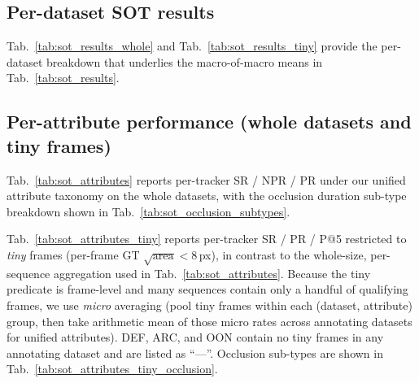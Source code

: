 \documentclass{article}
\begin{document}
\subsection{Per-dataset SOT results}
Tab.~\ref{tab:sot_results_whole} and Tab.~\ref{tab:sot_results_tiny} provide the
per-dataset breakdown that underlies the macro-of-macro means in
Tab.~\ref{tab:sot_results}.









\subsection{Per-attribute performance (whole datasets and tiny frames)}
Tab.~\ref{tab:sot_attributes} reports per-tracker SR / NPR / PR under our
unified attribute taxonomy on the whole datasets, with the occlusion
duration sub-type breakdown shown in Tab.~\ref{tab:sot_occlusion_subtypes}.



Tab.~\ref{tab:sot_attributes_tiny} reports per-tracker SR / PR / P@5 restricted
to \emph{tiny} frames (per-frame GT $\sqrt{\mathrm{area}} < 8$\,px), in contrast
to the whole-size, per-sequence aggregation used in
Tab.~\ref{tab:sot_attributes}. Because the tiny predicate is frame-level and
many sequences contain only a handful of qualifying frames, we use \emph{micro}
averaging (pool tiny frames within each (dataset, attribute) group, then take
arithmetic mean of those micro rates across annotating datasets for unified
attributes). DEF, ARC, and OON contain no tiny frames in any annotating dataset
and are listed as ``---''. Occlusion sub-types are shown in
Tab.~\ref{tab:sot_attributes_tiny_occlusion}.


\end{document}
